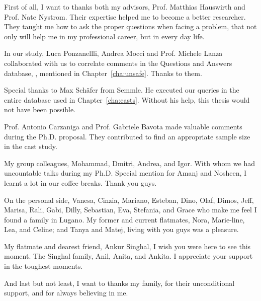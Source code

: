 \begin{acknowledgements}
First of all, I want to thanks both my advisors,
Prof. Matthias Hauswirth and Prof. Nate Nystrom.
Their expertise helped me to become a better researcher.
They taught me how to ask the proper questions when facing a problem,
that not only will help me in my professional career,
but in every day life.

In our \unsafe{} study,
Luca Ponzanellli, Andrea Mocci and Prof. Michele Lanza
collaborated with us to correlate \unsafe{} 
comments in the Questions and Answers database, \stackoverflow{}, mentioned in Chapter~\ref{cha:unsafe}.
Thanks to them.

Special thanks to Max Sch\"afer from Semmle.
He executed our \ql{} queries in the entire \lgtm{} database used in Chapter~\ref{cha:casts}.
Without his help, this thesis would not have been possible.

Prof. Antonio Carzaniga and Prof. Gabriele Bavota made valuable comments during the Ph.D. proposal.
They contributed to find an appropriate sample size in the cast study.

My group colleagues, Mohammad, Dmitri, Andrea, and Igor.
With whom we had uncountable talks during my Ph.D.
Special mention for Amanj and Nosheen,
I learnt a lot in our coffee breaks.
Thank you guys.

On the personal side,
Vanesa, Cinzia, Mariano, Esteban, Dino, Olaf, Dimos, Jeff, Marisa, Rali, Gabi, Dilly, Sebastian, Eva, Stefania, and Grace 
who make me feel I found a family in Lugano.
My former and current flatmates, Nora, Marie-line, Lea, and Celine;
and Tanya and Matej, living with you guys was a pleasure.

My flatmate and dearest friend, Ankur Singhal,
I wish you were here to see this moment.
The Singhal family, Anil, Anita, and Ankita.
I appreciate your support in the toughest moments.

And last but not least,
I want to thanks my family, for their unconditional support,
and for always believing in me.

\end{acknowledgements}
